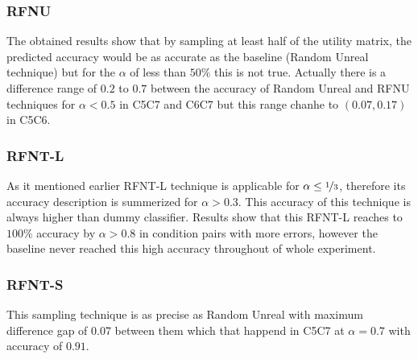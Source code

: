 \documentclass[10pt, conference, compsocconf]{IEEEtran}
\begin{document}
\subsubsection{RFNU}
The obtained results show that by sampling at least half of the utility matrix, 
the predicted accuracy would be as accurate as the baseline (Random Unreal technique) 
but for the $\alpha$ of less than $50\%$ this is not true. Actually there is a 
difference range of $0.2$ to $0.7$ between the accuracy of Random Unreal and RFNU techniques for
$\alpha <0.5$ in C5C7 and C6C7 but this range chanhe to $(0.07,0.17)$ in C5C6. 

\subsubsection{RFNT-L}
As it mentioned earlier RFNT-L technique is applicable for $\alpha \leq \nicefrac{1}{3}$, therefore its 
accuracy description is summerized for $\alpha > 0.3$. This accuracy of this technique is always higher than 
dummy classifier. Results show that this RFNT-L reaches to $100\%$ accuracy by $\alpha >0.8$ in condition pairs
with more errors, however the baseline never reached this high accuracy throughout of whole experiment.

\subsubsection{RFNT-S}
This sampling technique is as precise as Random Unreal with maximum difference gap of 0.07 between them which that 
happend in C5C7 at $\alpha = 0.7$ with accuracy of $0.91$. 
\end{document}
